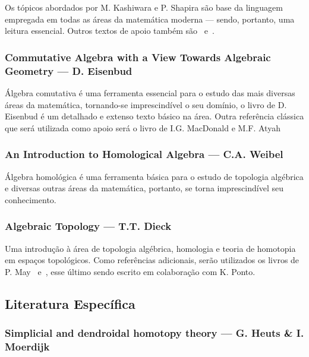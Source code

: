 \documentclass[11pt,reqno]{amsart}
\theoremstyle{definition}
\begin{document}
Os tópicos abordados por M. Kashiwara e P. Shapira são base da linguagem
empregada em todas as áreas da matemática moderna --- sendo, portanto, uma
leitura essencial. Outros textos de apoio também são~\cite{Rie16}
e~\cite{MacLane78}.

\subsubsection{
  \textbf{Commutative Algebra with a View Towards Algebraic Geometry}
  --- D. Eisenbud~\cite{Eisen95}
}

Álgebra comutativa é uma ferramenta essencial para o estudo das mais diversas
áreas da matemática, tornando-se imprescindível o seu domínio, o livro de
D. Eisenbud é um detalhado e extenso texto básico na área. Outra referência
clássica que será utilizada como apoio será o livro de I.G. MacDonald e
M.F. Atyah~\cite{MacDAty69}

\subsubsection{%
  \textbf{An Introduction to Homological Algebra} --- C.A. Weibel~\cite{Wei95}
}%

Álgebra homológica é uma ferramenta básica para o estudo de topologia algébrica
e diversas outras áreas da matemática, portanto, se torna imprescindível seu
conhecimento.

\subsubsection{%
  \textbf{Algebraic Topology} --- T.T. Dieck~\cite{Die08}
}%

Uma introdução à área de topologia algébrica, homologia e teoria de homotopia em
espaços topológicos. Como referências adicionais, serão utilizados os livros de
P. May~\cite{May99Concise} e~\cite{MayPonto12More}, esse último sendo escrito em
colaboração com K. Ponto.

\subsection{Literatura Específica}\label{sub:lit-esp}

\subsubsection{%
  \textbf{Simplicial and dendroidal homotopy theory}
  --- G. Heuts \& I. Moerdijk~\cite{HeuMoer22}
}
\end{document}
